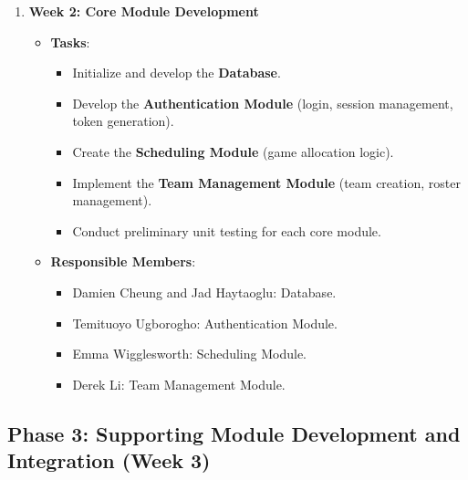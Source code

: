 \documentclass[12pt, titlepage]{article}
\begin{document}
\begin{enumerate}
  \item \textbf{Week 2: Core Module Development}
        \begin{itemize}
          \item \textbf{Tasks}:
                \begin{itemize}
                  \item Initialize and develop the \textbf{Database}.
                  \item Develop the \textbf{Authentication Module} (login, session management, token generation).
                  \item Create the \textbf{Scheduling Module} (game allocation logic).
                  \item Implement the \textbf{Team Management Module} (team creation, roster management).
                  \item Conduct preliminary unit testing for each core module.
                \end{itemize}
          \item \textbf{Responsible Members}:
                \begin{itemize}
                  \item Damien Cheung and Jad Haytaoglu: Database.
                  \item Temituoyo Ugborogho: Authentication Module.
                  \item Emma Wigglesworth: Scheduling Module.
                  \item Derek Li: Team Management Module.
                \end{itemize}
        \end{itemize}
\end{enumerate}

\subsection*{Phase 3: Supporting Module Development and Integration (Week 3)}
\end{document}
